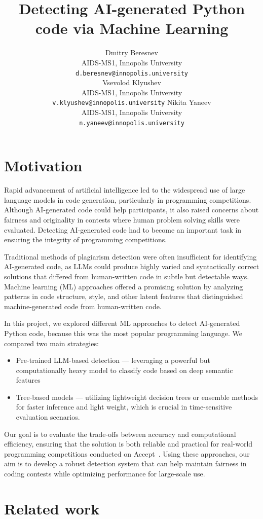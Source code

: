\documentclass{article}
\title{Detecting AI-generated Python code via Machine Learning}
\date{}
\author{
  \hspace{1mm}Dmitry Beresnev\\
	AIDS-MS1, Innopolis University\\
	\texttt{d.beresnev@innopolis.university}\\
	\And{}
  \hspace{1mm}Vsevolod Klyushev\\
	AIDS-MS1, Innopolis University\\
	\texttt{v.klyushev@innopolis.university}	\And{}
  \hspace{1mm}Nikita Yaneev\\
	AIDS-MS1, Innopolis University\\
	\texttt{n.yaneev@innopolis.university}
}
\begin{document}
\maketitle

\section{Motivation}
Rapid advancement of artificial intelligence led to the widespread use of large language models in code generation, particularly in programming competitions. Although AI-generated code could help participants, it also raised concerns about fairness and originality in contests where human problem solving skills were evaluated. Detecting AI-generated code had to become an important task in ensuring the integrity of programming competitions.

Traditional methods of plagiarism detection were often insufficient for identifying AI-generated code, as LLMs could produce highly varied and syntactically correct solutions that differed from human-written code in subtle but detectable ways. Machine learning (ML) approaches offered a promising solution by analyzing patterns in code structure, style, and other latent features that distinguished machine-generated code from human-written code.

In this project, we explored different ML approaches to detect AI-generated Python code, because this was the most popular programming language. We compared two main strategies:


\begin{itemize}
  \item Pre-trained LLM-based detection --- leveraging a powerful but computationally heavy model to classify code based on deep semantic features
  \item Tree-based models --- utilizing lightweight decision trees or ensemble methods for faster inference and light weight, which is crucial in time-sensitive evaluation scenarios.
\end{itemize}

Our goal is to evaluate the trade-offs between accuracy and computational efficiency, ensuring that the solution is both reliable and practical for real-world programming competitions conducted on Accept~\cite{Beresnev}. Using these approaches, our aim is to develop a robust detection system that can help maintain fairness in coding contests while optimizing performance for large-scale use.

\section{Related work}
\end{document}

